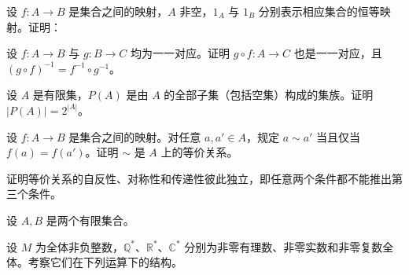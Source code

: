 \noindent\begin{minipage}{\textwidth}
设 $f:A\to B$ 是集合之间的映射，$A$ 非空，$1_A$ 与 $1_B$ 分别表示相应集合的恒等映射。证明：
\end{minipage}\par\vfill
\newpage
\noindent\begin{minipage}{\textwidth}
设 $f:A\to B$ 与 $g:B\to C$ 均为一一对应。证明 $g\circ f:A\to C$ 也是一一对应，且 $(g\circ f)^{-1}=f^{-1}\circ g^{-1}$。
\end{minipage}\par\vfill
\noindent\begin{minipage}{\textwidth}
设 $A$ 是有限集，$P(A)$ 是由 $A$ 的全部子集（包括空集）构成的集族。证明 $|P(A)|=2^{|A|}$。
\end{minipage}\par\vfill
\noindent\begin{minipage}{\textwidth}
设 $f:A\to B$ 是集合之间的映射。对任意 $a,a'\in A$，规定 $a\sim a'$ 当且仅当 $f(a)=f(a')$。证明 $\sim$ 是 $A$ 上的等价关系。
\end{minipage}\par\vfill
\newpage
\noindent\begin{minipage}{\textwidth}
证明等价关系的自反性、对称性和传递性彼此独立，即任意两个条件都不能推出第三个条件。
\end{minipage}\par\vfill
\noindent\begin{minipage}{\textwidth}
设 $A,B$ 是两个有限集合。
\end{minipage}\par\vfill
\noindent\begin{minipage}{\textwidth}
设 $M$ 为全体非负整数，$\mathbb{Q}^{*}$、$\mathbb{R}^{*}$、$\mathbb{C}^{*}$ 分别为非零有理数、非零实数和非零复数全体。考察它们在下列运算下的结构。
\end{minipage}\par\vfill
